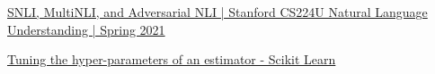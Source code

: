 

\begin{thebibliography}{77}

\href{https://www.youtube.com/watch?v=NAMNv4M2j3g}{SNLI, MultiNLI, and Adversarial NLI | Stanford CS224U Natural Language Understanding | Spring 2021}

\href{https://scikit-learn.org/stable/modules/grid_search.html}{Tuning the hyper-parameters of an estimator - Scikit Learn}

\end{thebibliography}